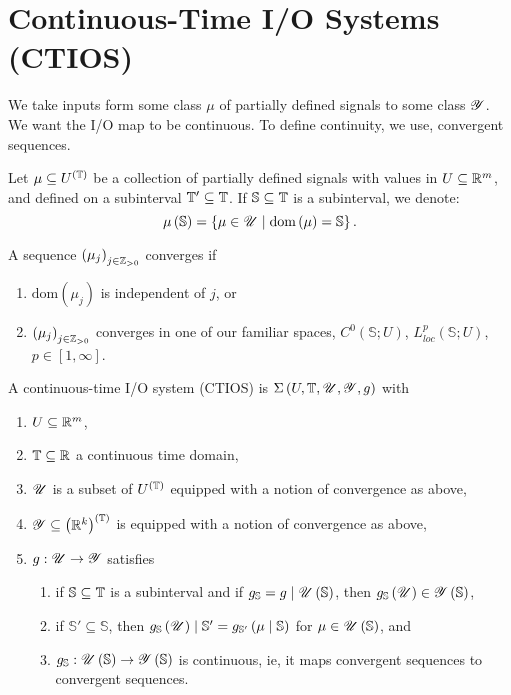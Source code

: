 
\section{Continuous-Time I/O Systems (CTIOS)}

We take inputs form some class $\mu$ of partially defined signals to some class $\mathscr{Y}$. We want the I/O map to be continuous. To define continuity, we use, convergent sequences. 

Let  $\mu \subseteq U^{\left( \mathbb{T} \right) }$ be a collection of partially defined signals with values in $U \subseteq \mathbb{R} ^{ m}$, and defined on a subinterval $\mathbb{T} '\subseteq \mathbb{T}$. If $\mathbb{S}\subseteq \mathbb{T}$ is a subinterval, we denote:
\[
	\mu\left( \mathbb{S} \right)  = \left\{ \mu \in  \mathscr{U}  \mid \text{dom}\left( \mu \right) = \mathbb{S} \right\} 
.\] 

A sequence $\left( \mu_j \right)_{j \in \mathbb{Z}_{>0}} $ converges if 
\begin{enumerate}
	\item $\text{dom}\left( \mu_{j} \right) $ is independent of $j$, or
	\item $\left( \mu_j \right) _{j \in  \mathbb{Z}_{>0}}$ converges in one of our familiar spaces, $C^{0}\left( \mathbb{S}; U \right) $, $L^{p}_{loc}\left( \mathbb{S}; U \right) $, $p \in  \left[ 1, \infty \right] $.
\end{enumerate}

\begin{definition}
	A continuous-time I/O system (CTIOS) is $\Sigma\left( U, \mathbb{T}, \mathscr{U}, \mathscr{Y}, g \right)$ with 
	\begin{enumerate}
		\item $U \subseteq \mathbb{R}^{m}$, 
		\item $\mathbb{T} \subseteq \mathbb{R}$ a continuous time domain, 
		\item $\mathscr{U}$ is a subset of $U^{\left( \mathbb{T} \right) }$ equipped with a notion of convergence as above,
		\item $\mathscr{Y} \subseteq \left( \mathbb{R}^{k} \right) ^{\left( \mathbb{T} \right) }$ is equipped with a notion of convergence as above, 
		\item $g : \mathscr{U} \to \mathscr{Y}$ satisfies 
			\begin{enumerate}
				\item if $\mathbb{S}\subseteq \mathbb{T}$ is a subinterval and if $g_{\mathbb{S}} = g  \mid \mathscr{U}\left( \mathbb{S} \right) $, then $g_{\mathbb{S}}\left( \mathscr{U} \right) \in \mathscr{Y}\left( \mathbb{S} \right)  $,
				\item if $\mathbb{S}' \subseteq \mathbb{S}$, then $g_{\mathbb{S}}\left( \mathscr{U} \right)  \mid \mathbb{S}' = g_{\mathbb{S}' }\left( \mu  \mid \mathbb{S} \right) $ for $\mu \in  \mathscr{U}\left( \mathbb{S} \right) $, and 
				\item $g_{\mathbb{S}} : \mathscr{U}\left( \mathbb{S} \right)  \to \mathscr{Y}\left( \mathbb{S} \right) $ is continuous, ie, it maps convergent sequences to convergent sequences. 
			\end{enumerate}
	\end{enumerate}
\end{definition}

